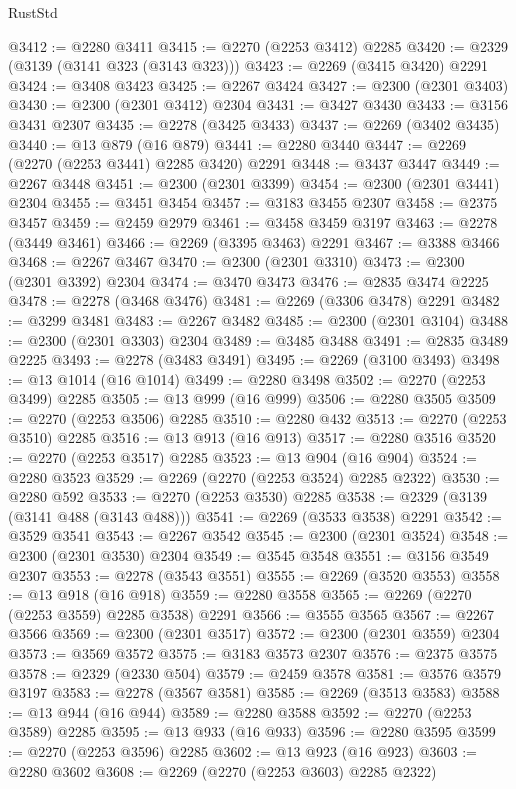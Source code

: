 \begin{lexlean}{RustStd}
\begin{coremodule}
@3412 := @2280 @3411
@3415 := @2270 (@2253 @3412) @2285
@3420 := @2329 (@3139 (@3141 @323 (@3143 @323)))
@3423 := @2269 (@3415 @3420) @2291
@3424 := @3408 @3423
@3425 := @2267 @3424
@3427 := @2300 (@2301 @3403)
@3430 := @2300 (@2301 @3412) @2304
@3431 := @3427 @3430
@3433 := @3156 @3431 @2307
@3435 := @2278 (@3425 @3433)
@3437 := @2269 (@3402 @3435)
@3440 := @13 @879 (@16 @879)
@3441 := @2280 @3440
@3447 := @2269 (@2270 (@2253 @3441) @2285 @3420) @2291
@3448 := @3437 @3447
@3449 := @2267 @3448
@3451 := @2300 (@2301 @3399)
@3454 := @2300 (@2301 @3441) @2304
@3455 := @3451 @3454
@3457 := @3183 @3455 @2307
@3458 := @2375 @3457
@3459 := @2459 @2979
@3461 := @3458 @3459 @3197
@3463 := @2278 (@3449 @3461)
@3466 := @2269 (@3395 @3463) @2291
@3467 := @3388 @3466
@3468 := @2267 @3467
@3470 := @2300 (@2301 @3310)
@3473 := @2300 (@2301 @3392) @2304
@3474 := @3470 @3473
@3476 := @2835 @3474 @2225
@3478 := @2278 (@3468 @3476)
@3481 := @2269 (@3306 @3478) @2291
@3482 := @3299 @3481
@3483 := @2267 @3482
@3485 := @2300 (@2301 @3104)
@3488 := @2300 (@2301 @3303) @2304
@3489 := @3485 @3488
@3491 := @2835 @3489 @2225
@3493 := @2278 (@3483 @3491)
@3495 := @2269 (@3100 @3493)
@3498 := @13 @1014 (@16 @1014)
@3499 := @2280 @3498
@3502 := @2270 (@2253 @3499) @2285
@3505 := @13 @999 (@16 @999)
@3506 := @2280 @3505
@3509 := @2270 (@2253 @3506) @2285
@3510 := @2280 @432
@3513 := @2270 (@2253 @3510) @2285
@3516 := @13 @913 (@16 @913)
@3517 := @2280 @3516
@3520 := @2270 (@2253 @3517) @2285
@3523 := @13 @904 (@16 @904)
@3524 := @2280 @3523
@3529 := @2269 (@2270 (@2253 @3524) @2285 @2322)
@3530 := @2280 @592
@3533 := @2270 (@2253 @3530) @2285
@3538 := @2329 (@3139 (@3141 @488 (@3143 @488)))
@3541 := @2269 (@3533 @3538) @2291
@3542 := @3529 @3541
@3543 := @2267 @3542
@3545 := @2300 (@2301 @3524)
@3548 := @2300 (@2301 @3530) @2304
@3549 := @3545 @3548
@3551 := @3156 @3549 @2307
@3553 := @2278 (@3543 @3551)
@3555 := @2269 (@3520 @3553)
@3558 := @13 @918 (@16 @918)
@3559 := @2280 @3558
@3565 := @2269 (@2270 (@2253 @3559) @2285 @3538) @2291
@3566 := @3555 @3565
@3567 := @2267 @3566
@3569 := @2300 (@2301 @3517)
@3572 := @2300 (@2301 @3559) @2304
@3573 := @3569 @3572
@3575 := @3183 @3573 @2307
@3576 := @2375 @3575
@3578 := @2329 (@2330 @504)
@3579 := @2459 @3578
@3581 := @3576 @3579 @3197
@3583 := @2278 (@3567 @3581)
@3585 := @2269 (@3513 @3583)
@3588 := @13 @944 (@16 @944)
@3589 := @2280 @3588
@3592 := @2270 (@2253 @3589) @2285
@3595 := @13 @933 (@16 @933)
@3596 := @2280 @3595
@3599 := @2270 (@2253 @3596) @2285
@3602 := @13 @923 (@16 @923)
@3603 := @2280 @3602
@3608 := @2269 (@2270 (@2253 @3603) @2285 @2322)

\end{coremodule}
\end{lexlean}
